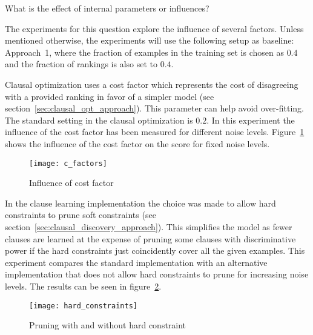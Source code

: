\begin{question}
	What is the effect of internal parameters or influences?
\end{question}

The experiments for this question explore the influence of several factors.
Unless mentioned otherwise, the experiments will use the following setup as baseline:
Approach~1, where the fraction of examples in the training set is chosen as $0.4$ and the fraction of rankings is also set to $0.4$.

\begin{experiment}
	
	Clausal optimization uses a cost factor which represents the cost of disagreeing with a provided ranking in favor of a simpler model (see section~\ref{sec:clausal_opt_approach}).
	This parameter can help avoid over-fitting.
	The standard setting in the clausal optimization is $0.2$.
	In this experiment the influence of the cost factor has been measured for different noise levels.
	Figure~\ref{fig:c_factors} shows the influence of the cost factor on the score for fixed noise levels.

	\begin{figure}

		\caption{Influence of cost factor}
		\centering
			\texttt{[image: c\_factors]}
		\label{fig:c_factors}

	\end{figure}

\end{experiment}


\begin{experiment}
	
	In the clause learning implementation the choice was made to allow hard constraints to prune soft constraints (see section~\ref{sec:clausal_discovery_approach}).
	This simplifies the model as fewer clauses are learned at the expense of pruning some clauses with discriminative power if the hard constraints just coincidently cover all the given examples.
	This experiment compares the standard implementation with an alternative implementation that does not allow hard constraints to prune for increasing noise levels.
	The results can be seen in figure~\ref{fig:hard_constraints}.

	\begin{figure}

		\caption{Pruning with and without hard constraint}
		\centering
			\texttt{[image: hard\_constraints]}
		\label{fig:hard_constraints}

	\end{figure}

\end{experiment}

